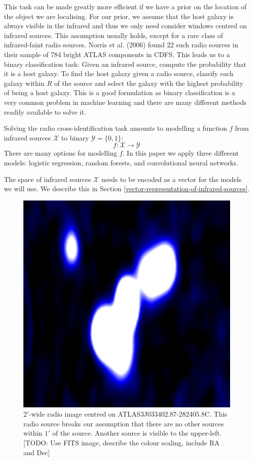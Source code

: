 \documentclass[fleqn,usenatbib,usedcolumn]{mnras}
\begin{document}
    This task can be made greatly more efficient if we have a prior on the
    location of the object we are localising. For our prior, we assume that
    the host galaxy is always visible in the infrared and thus we only need
    consider windows centred on infrared sources. This assumption usually
    holds, except for a rare class of infrared-faint radio sources. Norris et
    al. (2006) found 22 such radio sources in their sample of 784 bright ATLAS
    components in CDFS. This leads us to a binary classification task: Given
    an infrared source, compute the probability that it is a host galaxy. To
    find the host galaxy given a radio source, classify each galaxy within
    \(R\) of the source and select the galaxy with the highest probability of
    being a host galaxy. This is a good formulation as binary classification
    is a very common problem in machine learning and there are many different
    methods readily available to solve it.

    Solving the radio cross-identification task amounts to modelling a
    function \(f\) from infrared sources \(\mathcal{X}\) to binary
    \(\mathcal{Y} = \{0, 1\}\): \[
        f : \mathcal{X} \to \mathcal{Y}
    \] There are many options for modelling \(f\). In this paper we apply
    three different models: logistic regression, random forests, and
    convolutional neural networks.

    The space of infrared sources \(\mathcal{X}\) needs to be encoded as a
    vector for the models we will use. We describe this in Section
    \ref{vector-representation-of-infrared-sources}.

    \begin{figure}
      \centering
      \includegraphics[width=0.5\linewidth]{images/ARG0003r2v_radio.png}
      \caption{$2'$-wide radio image centred on ATLAS3\textunderscore{}J033402.87-282405.8C.
        This radio source breaks our assumption that there are
        no other sources within $1'$ of the source. Another source is
        visible to the upper-left. [TODO: Use FITS image, describe the colour scaling, include RA and Dec]}
      \label{fig:broken-isolation}
    \end{figure}
\end{document}
